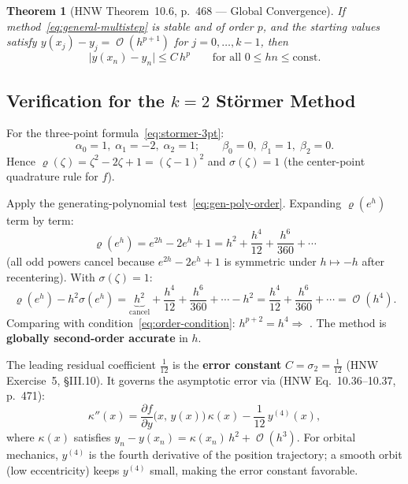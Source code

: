 \documentclass[11pt]{article}
\newtheorem{theorem}{Theorem}
\DeclareMathOperator{\OO}{\mathcal{O}}
\begin{document}
\begin{theorem}[HNW Theorem~10.6, p.~468 --- Global Convergence]
\label{thm:convergence}
If method~\eqref{eq:general-multistep} is stable and of order $p$, and the
starting values satisfy $y(x_j) - y_j = \OO(h^{p+1})$ for $j = 0,\ldots,k-1$,
then
\begin{equation}
  \label{eq:global-error}
  \bigl|y(x_n) - y_n\bigr| \leq C\,h^p
  \qquad \text{for all } 0 \leq hn \leq \mathrm{const}.
\end{equation}
\end{theorem}

\subsection{Verification for the \texorpdfstring{$k=2$}{k=2} Störmer Method}
\label{ssec:order-k2}

For the three-point formula~\eqref{eq:stormer-3pt}:
\begin{equation}
  \label{eq:k2-coefficients}
  \alpha_0 = 1,\;\alpha_1 = -2,\;\alpha_2 = 1;
  \qquad
  \beta_0 = 0,\;\beta_1 = 1,\;\beta_2 = 0.
\end{equation}
Hence $\varrho(\zeta) = \zeta^2 - 2\zeta + 1 = (\zeta-1)^2$ and
$\sigma(\zeta) = 1$ (the center-point quadrature rule for $f$).

Apply the generating-polynomial test~\eqref{eq:gen-poly-order}.  Expanding
$\varrho(e^h)$ term by term:
\begin{equation}
  \varrho(e^h)
  = e^{2h} - 2e^h + 1
  = h^2 + \frac{h^4}{12} + \frac{h^6}{360} + \cdots
\end{equation}
(all odd powers cancel because $e^{2h} - 2e^h + 1$ is symmetric under $h
\mapsto -h$ after recentering).  With $\sigma(\zeta)=1$:
\begin{equation}
  \label{eq:k2-residual}
  \varrho(e^h) - h^2\sigma(e^h)
  = \underbrace{h^2}_{\text{cancel}} + \frac{h^4}{12} + \frac{h^6}{360} + \cdots
    - h^2
  = \frac{h^4}{12} + \frac{h^6}{360} + \cdots
  = \OO(h^4).
\end{equation}
Comparing with condition~\eqref{eq:order-condition}: $h^{p+2} = h^4 \Rightarrow$
. The method is \textbf{globally second-order accurate} in $h$.

The leading residual coefficient $\tfrac{1}{12}$ is the \textbf{error constant}
$C = \sigma_2 = \tfrac{1}{12}$ (HNW Exercise~5, §III.10).  It governs the
asymptotic error via (HNW Eq.~10.36--10.37, p.~471):
\begin{equation}
  \label{eq:error-ode}
  \kappa''(x) = \frac{\partial f}{\partial y}\bigl(x,\, y(x)\bigr)\,\kappa(x)
                - \frac{1}{12}\, y^{(4)}(x),
\end{equation}
where $\kappa(x)$ satisfies $y_n - y(x_n) = \kappa(x_n)\,h^2 + \OO(h^3)$.
For orbital mechanics, $y^{(4)}$ is the fourth derivative of the position
trajectory; a smooth orbit (low eccentricity) keeps $y^{(4)}$ small, making
the error constant favorable.
\end{document}
